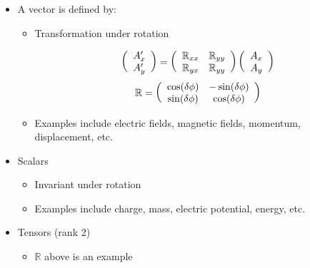\begin{itemize}

  \item A vector is defined by:

    \begin{itemize}

      \item Transformation under rotation

        $$\left( \begin{array}{c} A_x'\\A_y'\end{array} \right)=\left( \begin{array}{c c} \mathbb{R}_{xx} & \mathbb{R}_{yy}\\ \mathbb{R}_{yx} & \mathbb{R}_{yy}\end{array} \right)\left( \begin{array}{c} A_x\\ A_y\end{array} \right)$$
      $$\mathbb{R}=\left( \begin{array}{c c}\cos(\delta\phi) & -\sin(\delta\phi)\\ \sin(\delta\phi) & \cos(\delta\phi) \end{array} \right)$$

      \item Examples include electric fields, magnetic fields, momentum, displacement, etc.

    \end{itemize}

  \item Scalars

    \begin{itemize}

      \item Invariant under rotation

      \item Examples include charge, mass, electric potential, energy, etc.

    \end{itemize}

  \item Tensors (rank 2)

    \begin{itemize}

      \item $\mathbb{R}$ above is an example

    \end{itemize}


\end{itemize}
